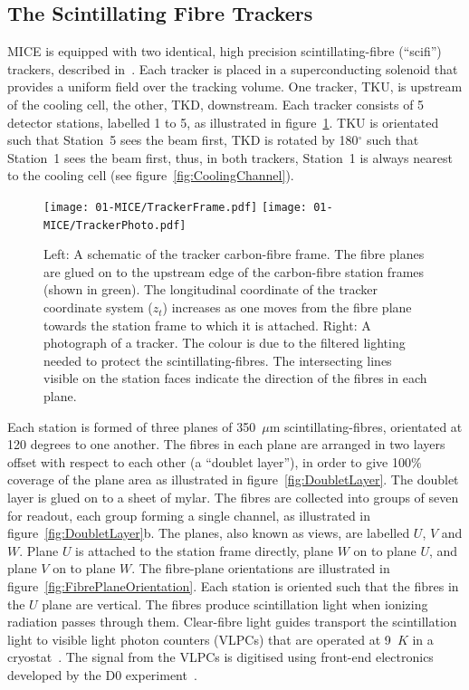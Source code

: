   \subsection{The Scintillating Fibre Trackers}
  \label{subsec:Trackers}
  MICE is equipped with two identical, high precision scintillating-fibre (``scifi'') trackers, described in~\cite{TrackersNIM}. Each tracker is placed in a superconducting solenoid that provides a uniform field over the tracking volume. One tracker, TKU, is upstream of the cooling cell, the other, TKD, downstream.  Each tracker consists of 5 detector stations, labelled 1 to 5, as illustrated in figure~\ref{fig:Trackers}. TKU is orientated such that Station~5 sees the beam first, TKD is rotated by 180$^\circ$ such that Station~1 sees the beam first, thus, in both trackers, Station~1 is always nearest to the cooling cell (see figure~\ref{fig:CoolingChannel}).
  
  \begin{figure}[bt]
    \centering
    \texttt{[image: 01-MICE/TrackerFrame.pdf]} \hspace{2pc}%
    \texttt{[image: 01-MICE/TrackerPhoto.pdf]}
    \caption{\label{fig:Trackers} Left: A schematic of the tracker carbon-fibre frame.  The fibre planes are glued on to the upstream edge of the carbon-fibre station frames (shown in green). The longitudinal coordinate of the tracker coordinate system ($z_t$) increases as one moves from the fibre plane towards the station frame to which it is attached.  Right: A photograph of a tracker. The colour is due to the filtered lighting needed to protect the scintillating-fibres. The intersecting lines visible on the station faces indicate the direction of the fibres in each plane.}
  \end{figure}

  Each station is formed of three planes of 350~$\mu$m scintillating-fibres, orientated at 120 degrees to one another. The fibres in each plane are arranged in two layers offset with respect to each other (a ``doublet layer''), in order to give 100$\%$ coverage of the plane area as illustrated in figure~\ref{fig:DoubletLayer}. The doublet layer is glued on to a sheet of mylar. The fibres are collected into groups of seven for readout, each group forming a single channel, as illustrated in figure~\ref{fig:DoubletLayer}b. The planes, also known as views, are labelled $U$, $V$ and $W$. Plane $U$ is attached to the station frame directly, plane $W$ on to plane $U$, and plane $V$ on to plane $W$. The fibre-plane orientations are illustrated in figure~\ref{fig:FibrePlaneOrientation}. Each station is oriented such that the fibres in the $U$ plane are vertical. The fibres produce scintillation light when ionizing radiation passes through them. Clear-fibre light guides transport the scintillation light to visible light photon counters (VLPCs) that are operated at 9~$K$ in a cryostat~\cite{TrackersNIM}. The signal from the VLPCs is digitised using front-end electronics developed by the D0 experiment~\cite{D0}. %

